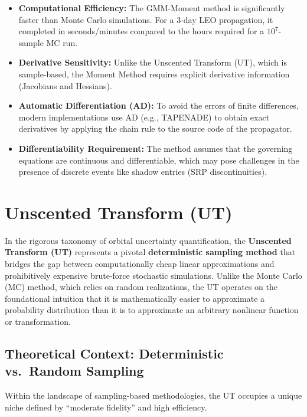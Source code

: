 \documentclass[
  letterpaper,
  DIV=11,
  numbers=noendperiod,
  oneside]{scrartcl}
\begin{document}
\begin{itemize}
\item
  \textbf{Computational Efficiency:} The GMM-Moment method is
  significantly faster than Monte Carlo simulations. For a 3-day LEO
  propagation, it completed in seconds/minutes compared to the hours
  required for a \(10^7\)-sample MC run.
\item
  \textbf{Derivative Sensitivity:} Unlike the Unscented Transform (UT),
  which is sample-based, the Moment Method requires explicit derivative
  information (Jacobians and Hessians).
\item
  \textbf{Automatic Differentiation (AD):} To avoid the errors of finite
  differences, modern implementations use AD (e.g., TAPENADE) to obtain
  exact derivatives by applying the chain rule to the source code of the
  propagator.
\item
  \textbf{Differentiability Requirement:} The method assumes that the
  governing equations are continuous and differentiable, which may pose
  challenges in the presence of discrete events like shadow entries (SRP
  discontinuities).
\end{itemize}

\section{Unscented Transform (UT)}\label{unscented-transform-ut}

In the rigorous taxonomy of orbital uncertainty quantification, the
\textbf{Unscented Transform (UT)} represents a pivotal
\textbf{deterministic sampling method} that bridges the gap between
computationally cheap linear approximations and prohibitively expensive
brute-force stochastic simulations. Unlike the Monte Carlo (MC) method,
which relies on random realizations, the UT operates on the foundational
intuition that it is mathematically easier to approximate a probability
distribution than it is to approximate an arbitrary nonlinear function
or transformation.

\subsection{Theoretical Context: Deterministic vs.~Random
Sampling}\label{theoretical-context-deterministic-vs.-random-sampling}

Within the landscape of sampling-based methodologies, the UT occupies a
unique niche defined by ``moderate fidelity'' and high efficiency.
\end{document}
